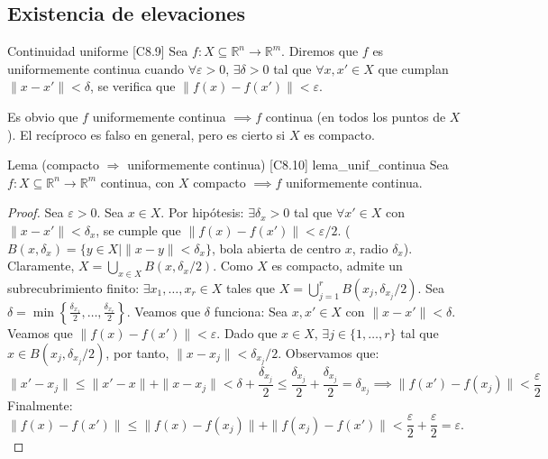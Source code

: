 \vspace{0.5cm}
\subsection{Existencia de elevaciones}

\begin{definicion}{Continuidad uniforme [C8.9]}{}
Sea $f: X \subseteq \mathbb{R}^n \to \mathbb{R}^m$. Diremos que $f$ es uniformemente continua cuando $\forall \varepsilon > 0$, $\exists \delta > 0$ tal que $\forall x, x' \in X$ que cumplan $\|x-x'\| < \delta$, se verifica que $\|f(x)-f(x')\| < \varepsilon$.
\end{definicion}

Es obvio que $f$ uniformemente continua $\implies f$ continua (en todos los puntos de $X$). El recíproco es falso en general, pero es cierto si $X$ es compacto.

\begin{proposicion}{Lema (compacto $\Rightarrow$ uniformemente continua) [C8.10] \marcaL}{lema_unif_continua}
Sea $f: X \subseteq \mathbb{R}^n \to \mathbb{R}^m$ continua, con $X$ compacto $\implies f$ uniformemente continua.
\end{proposicion}

\begin{proof}
Sea $\varepsilon > 0$. Sea $x \in X$. Por hipótesis:
$\exists \delta_x > 0$ tal que $\forall x' \in X$ con $\|x-x'\| < \delta_x$, se cumple que $\|f(x)-f(x')\| < \varepsilon/2$. ($B(x,\delta_x) = \{y \in X \mid \|x-y\| < \delta_x\}$, bola abierta de centro $x$, radio $\delta_x$).
Claramente, $X = \bigcup_{x\in X} B(x, \delta_x/2)$.
Como $X$ es compacto, admite un subrecubrimiento finito: $\exists x_1, \dots, x_r \in X$ tales que $X = \bigcup_{j=1}^r B(x_j, \delta_{x_j}/2)$.
Sea $\delta = \min \left\{\frac{\delta_{x_1}}{2}, \dots, \frac{\delta_{x_r}}{2}\right\}$.
Veamos que $\delta$ funciona:
Sea $x,x' \in X$ con $\|x-x'\| < \delta$. Veamos que $\|f(x)-f(x')\| < \varepsilon$.
Dado que $x \in X$, $\exists j \in \{1,\dots,r\}$ tal que $x \in B(x_j, \delta_{x_j}/2)$, por tanto, $\|x-x_j\| < \delta_{x_j}/2$.
Observamos que:
\[ \|x'-x_j\| \leq \|x'-x\| + \|x-x_j\| < \delta + \frac{\delta_{x_j}}{2} \leq \frac{\delta_{x_j}}{2} + \frac{\delta_{x_j}}{2} = \delta_{x_j} \implies \|f(x')-f(x_j)\| < \frac{\varepsilon}{2} \]
Finalmente:
\[ \|f(x)-f(x')\| \leq \|f(x)-f(x_j)\| + \|f(x_j)-f(x')\| < \frac{\varepsilon}{2} + \frac{\varepsilon}{2} = \varepsilon. \]
\end{proof}

